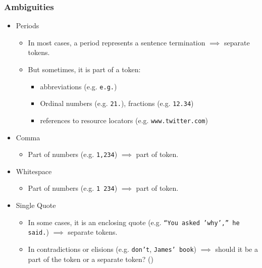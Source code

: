             \subsubsection{Ambiguities} %
                \begin{itemize}
                	\item Periods
                		\begin{itemize}
                			\item In most cases, a period represents a sentence termination \( \implies \) separate tokens.
                			\item But sometimes, it is part of a token:
                				\begin{itemize}
                					\item abbreviations (e.g. \texttt{e.g.})
                					\item Ordinal numbers (e.g. \texttt{21.}), fractions (e.g. \texttt{12.34})
                					\item references to resource locators (e.g. \texttt{www.twitter.com})
                				\end{itemize}
                		\end{itemize}
                	\item Comma
                		\begin{itemize}
                			\item Part of numbers (e.g. \texttt{1,234}) \( \implies \) part of token.
                		\end{itemize}
                	\item Whitespace
                		\begin{itemize}
                			\item Part of numbers (e.g. \texttt{1 234}) \( \implies \) part of token.
                		\end{itemize}
                	\item Single Quote
                		\begin{itemize}
                			\item In some cases, it is an enclosing quote (e.g. \texttt{\enquote{You asked 'why',} he said.}) \(\implies\) separate tokens.
                			\item In contradictions or elisions (e.g. \texttt{don't}, \texttt{James' book}) \(\implies\) should it be a part of the token or a separate token? ()
                		\end{itemize}

\end{itemize}
